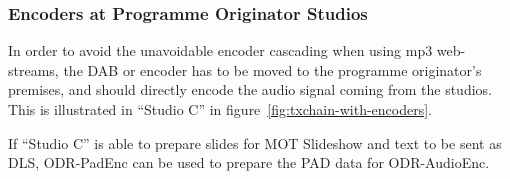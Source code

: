 \subsubsection{Encoders at Programme Originator Studios}
In order to avoid the unavoidable encoder cascading when using mp3 web-streams,
the DAB or \dabplus encoder has to be moved to the programme originator's
premises, and should directly encode the audio signal coming from the studios.
This is illustrated in ``Studio C'' in figure~\ref{fig:txchain-with-encoders}.

If ``Studio C'' is able to prepare slides for MOT Slideshow and text to be sent
as DLS, ODR-PadEnc can be used to prepare the PAD data for ODR-AudioEnc.

